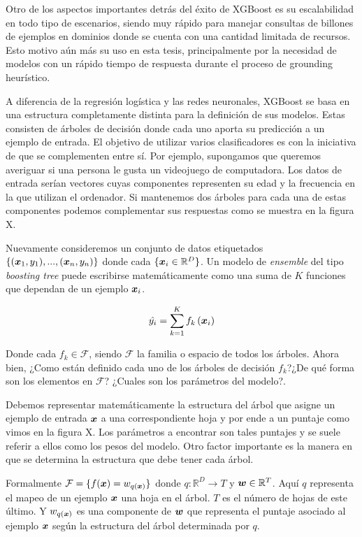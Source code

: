 Otro de los aspectos importantes detrás del éxito de XGBoost es su escalabilidad
en todo tipo de escenarios, siendo muy rápido para manejar consultas de billones
de ejemplos en dominios donde se cuenta con una cantidad limitada de recursos.
Esto motivo aún más su uso en esta tesis, principalmente por la necesidad de
modelos con un rápido tiempo de respuesta durante el proceso de grounding
heurístico.

A diferencia de la regresión logística y las redes neuronales, XGBoost se basa
en una estructura completamente distinta para la definición de sus modelos.
Estas consisten de árboles de decisión donde cada uno aporta su predicción a un
ejemplo de entrada. El objetivo de utilizar varios clasificadores es con la
iniciativa de que se complementen entre sí. Por ejemplo, supongamos que queremos
averiguar si una persona le gusta un videojuego de computadora. Los datos de
entrada serían vectores cuyas componentes representen su edad y la frecuencia en
la que utilizan el ordenador. Si mantenemos dos árboles para cada una de estas
componentes podemos complementar sus respuestas como se muestra en la figura X.

Nuevamente consideremos un conjunto de datos etiquetados $\{(\boldsymbol{x}_1, y_1),
..., (\boldsymbol{x}_n, y_n)\}$ donde cada $\{\boldsymbol{x}_i \in \mathbb{R}^{D}\}$. Un
modelo de \emph{ensemble} del tipo \emph{boosting tree} puede escribirse
matemáticamente como una suma de $K$ funciones que dependan de un ejemplo
$\boldsymbol{x}_i$.

\begin{equation} \label{eq:xgb-model-1}
    \hat{y_{i}} = \sum_{k=1}^{K} f_{k} \left( \boldsymbol{x}_{i}\right)
\end{equation}

Donde cada $f_k \in \mathcal{F}$, siendo $\mathcal{F}$ la familia o espacio de todos los árboles. Ahora bien, ¿Como están definido cada uno de
los árboles de decisión $f_k$?¿De qué forma son los elementos en $\mathcal{F}$?
¿Cuales son los parámetros del modelo?.

Debemos representar matemáticamente la
estructura del árbol que asigne un ejemplo de entrada $\boldsymbol{x}$ a una
correspondiente hoja y por ende a un puntaje como vimos en la figura X. Los
parámetros a encontrar son tales puntajes y se suele referir a ellos como los
pesos del modelo. Otro factor importante es la manera en que se determina la
estructura que debe tener cada árbol.

Formalmente $\mathcal{F} = \{f(\boldsymbol{x}) = w_{q\left( \boldsymbol{x} \right)}\}$ donde
$q : \mathbb{R}^{D} \rightarrow T$ y $\boldsymbol{w} \in \mathbb{R}^{T}$. Aquí $q$
representa el mapeo de un ejemplo $\boldsymbol{x}$ una hoja en el árbol. $T$ es el
número de hojas de este último. Y $w_{q\left( \boldsymbol{x} \right)}$ es una
componente de $\boldsymbol{w}$ que representa el puntaje asociado al ejemplo
$\boldsymbol{x}$ según la estructura del árbol determinada por $q$.

